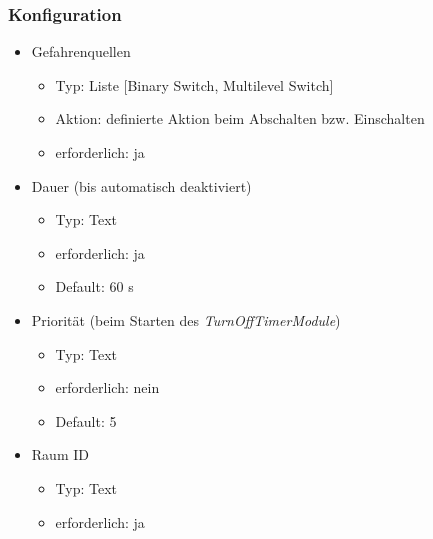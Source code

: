 \subsubsection{Konfiguration}
\begin{itemize}
	\item Gefahrenquellen
	\begin{itemize}
		\item Typ: Liste [Binary Switch, Multilevel Switch]
		\item Aktion: definierte Aktion beim Abschalten bzw. Einschalten
		\item erforderlich: ja
	\end{itemize}
	
	\item Dauer (bis automatisch deaktiviert)
	\begin{itemize}
		\item Typ: Text
		\item erforderlich: ja
		\item Default: 60 s
	\end{itemize}
	
	\item Priorität (beim Starten des \emph{TurnOffTimerModule})
	\begin{itemize}
		\item Typ: Text
		\item erforderlich: nein
		\item Default: 5
	\end{itemize}
	
	\item Raum ID
	\begin{itemize}
		\item Typ: Text
		\item erforderlich: ja
	\end{itemize}
\end{itemize}

